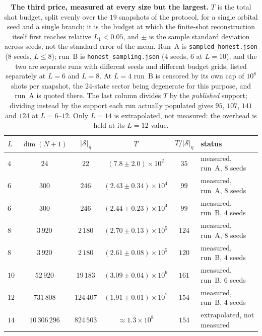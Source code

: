 \begin{table}[tp]\centering\small
\caption{\textbf{The third price, measured at every size but the largest.} $T$ is the total shot budget,
split evenly over the $19$ snapshots of the protocol, for a single orbital seed and a single branch; it
is the budget at which the finite-shot reconstruction itself first reaches relative $L_1<0.05$, and
$\pm$ is the sample standard deviation across seeds, not the standard error of the mean. Run~A is
\texttt{sampled\_honest.json} ($8$ seeds, $L\le8$); run~B is \texttt{honest\_sampling.json} ($4$ seeds,
$6$ at $L=10$), and the two are separate runs with different seeds and different budget grids, listed
separately at $L=6$ and $L=8$. At $L=4$ run~B
is censored by its own cap of $10^{8}$ shots per snapshot, the $24$-state sector being degenerate for
this purpose, and run~A is quoted there. The last column divides $T$ by the \emph{published} support;
dividing instead by the support each run actually populated gives $95$, $107$, $141$ and $124$ at
$L=6$--$12$. Only $L=14$ is extrapolated, not measured: the overhead is held at its $L=12$
value.}\label{tab:shots}
\setlength{\tabcolsep}{5pt}
\begin{tabular}{lccccl}
\toprule
$L$ & $\dim(N{+}1)$ & $|\mathcal S|_\eta$ & $T$ & $T/|\mathcal S|_\eta$ & status\\
\midrule
$4$  & $24$           & $22$       & $(7.8\pm2.0)\times10^{2}$   & $35$  & measured, run~A, $8$ seeds\\
$6$  & $300$          & $246$      & $(2.43\pm0.34)\times10^{4}$ & $99$  & measured, run~A, $8$ seeds\\
$6$  & $300$          & $246$      & $(2.44\pm0.23)\times10^{4}$ & $99$  & measured, run~B, $4$ seeds\\
$8$  & $3\,920$       & $2\,180$   & $(2.70\pm0.13)\times10^{5}$ & $124$ & measured, run~A, $8$ seeds\\
$8$  & $3\,920$       & $2\,180$   & $(2.61\pm0.08)\times10^{5}$ & $120$ & measured, run~B, $4$ seeds\\
$10$ & $52\,920$      & $19\,183$  & $(3.09\pm0.04)\times10^{6}$ & $161$ & measured, run~B, $6$ seeds\\
$12$ & $731\,808$     & $124\,407$ & $(1.91\pm0.01)\times10^{7}$ & $154$ & measured, run~B, $4$ seeds\\
$14$ & $10\,306\,296$ & $824\,503$ & ${\approx}1.3\times10^{8}$  & $154$ & extrapolated, not measured\\
\bottomrule
\end{tabular}
\end{table}

